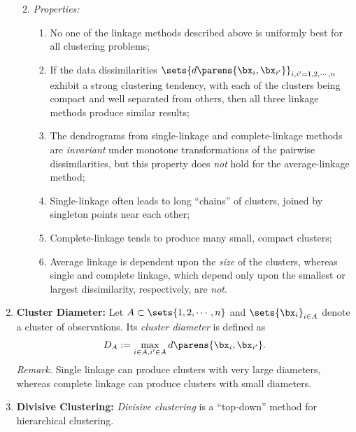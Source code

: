 \documentclass[12pt]{article}
\begin{document}
\begin{enumerate}[label=\textbf{\arabic*.}]
\begin{enumerate}
\begin{minipage}{\linewidth}
\begin{algorithm}[H]
\begin{algorithmic}[1]
				\end{algorithmic} 
			\end{algorithm}
		\end{minipage}
		
		\vspace{10pt}
		
		\item \textit{Properties:} 
		\begin{enumerate}
			\item No one of the linkage methods described above is uniformly best for all clustering problems; 
			\item If the data dissimilarities $\sets{d \parens{\bx_i, \bx_{i'}}}_{i,i'=1,2,\cdots,n}$ exhibit a strong clustering tendency, with each of the clusters being compact and well separated from others, then all three linkage methods produce similar results; 
			\item The dendrograms from single-linkage and complete-linkage methods are \emph{invariant} under monotone transformations of the pairwise dissimilarities, but this property does \emph{not} hold for the average-linkage method; 
			\item Single-linkage often leads to long ``chains'' of clusters, joined by singleton points near each other; 
			\item Complete-linkage tends to produce many small, compact clusters; 
			\item Average linkage is dependent upon the \emph{size} of the clusters, whereas single and complete linkage, which depend only upon the smallest or largest dissimilarity, respectively, are \emph{not}. 
		\end{enumerate}	
	\end{enumerate}
	
	\item \textbf{Cluster Diameter:} Let $A \subset \sets{1, 2, \cdots, n}$ and $\sets{\bx_i}_{i \in A}$ denote a cluster of observations. Its \emph{cluster diameter} is defined as 
	\begin{align}
		D_A := \max_{i \in A, i' \in A} d \parens{\bx_i, \bx_{i'}}. 
	\end{align}
	\textit{Remark.} Single linkage can produce clusters with very large diameters, whereas complete linkage can produce clusters with small diameters. 
	
	\item \textbf{Divisive Clustering:} \emph{Divisive clustering} is a ``top-down'' method for hierarchical clustering. 
	

\end{enumerate}
\end{document}
